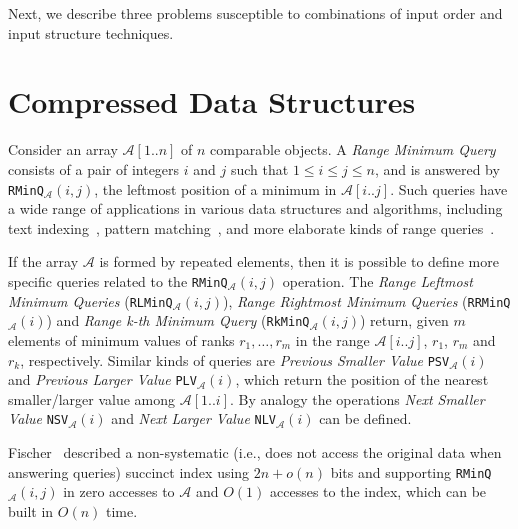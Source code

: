 Next, we describe three problems susceptible to combinations of input
order and input structure techniques.

\section{Compressed Data Structures}
\label{sec:compressed}

Consider an array ${\mathcal{A}}[1..n]$ of $n$ comparable objects. A \emph{Range
  Minimum
  Query}~\cite{1993-SICOMP-RecursiveStarTreeParallelDataStructure-BerkmanVishkin}
consists of a pair of integers $i$ and $j$ such that
$1\le i\le j\le n$, and is answered by
\texttt{RMinQ}$_{\mathcal{A}}(i,j)$, the leftmost position of a
minimum in $\mathcal{A}[i..j]$. Such queries have a wide range of
applications in various data structures and algorithms, including text
indexing~\cite{2009-TCS-FasterEntropyBoundedCompressedSuffixTrees-FischerMakinenNavarro},
pattern
matching~\cite{2008-STACS-ImprovedAlgorithmsForTheRangeNextValueProblemAndApplications-CrochemoreIliopoulosKubicaRahmanWalen},
and more elaborate kinds of range
queries~\cite{2004-ISAAC-OnTheRangeMaximumSumSegmentQueryProblem-ChenChao}.


If the array $\mathcal{A}$ is formed by repeated elements, then it is possible
to define more specific queries related to the
\texttt{RMinQ}$_{\mathcal{A}}(i,j)$ operation. The \emph{Range
  Leftmost Minimum Queries} (\texttt{RLMinQ}$_{\mathcal{A}}(i,j)$),
\emph{Range Rightmost Minimum Queries}
(\texttt{RRMinQ}$_{\mathcal{A}}(i)$) and \emph{Range k-th Minimum
  Query} (\texttt{RkMinQ}$_{\mathcal{A}}(i,j)$) return, given $m$
elements of minimum values of ranks $r_1, \dots, r_m$ in the range
${\mathcal{A}}[i..j]$, $r_1$, $r_m$ and $r_k$, respectively.
Similar kinds of queries are \emph{Previous Smaller Value}
\texttt{PSV}$_{\mathcal{A}}(i)$ and \emph{Previous Larger Value}
\texttt{PLV}$_{\mathcal{A}}(i)$, which return the position of the nearest
smaller/larger value among ${\mathcal{A}}[1..i]$. By analogy the operations
\emph{Next Smaller Value} \texttt{NSV}$_{\mathcal{A}}(i)$ and \emph{Next Larger Value}
\texttt{NLV}$_{\mathcal{A}}(i)$ can be defined.

Fischer~\cite{2010-LATIN-OptimalSuccinctnessForRangeMinimumQueries-Fischer}
described a non-systematic (i.e., does not access the original data
when answering queries) succinct index using $2n+o(n)$ bits and
supporting \texttt{RMinQ}$_{\mathcal{A}}(i,j)$ in zero accesses to
$\mathcal{A}$ and $O(1)$ accesses to the index, which can be built in
$O(n)$ time.

